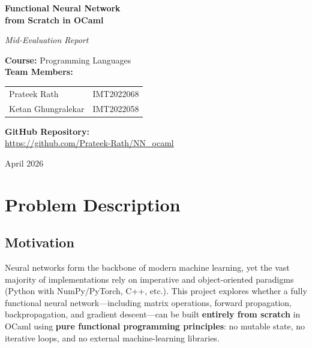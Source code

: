 \documentclass[12pt, a4paper]{article}
\begin{document}
\begin{titlepage}
    \centering
    \vspace*{2cm}
    
    {\Huge\bfseries Functional Neural Network\\[0.3cm] from Scratch in OCaml\par}
    
    \vspace{1.5cm}
    
    {\Large\textit{Mid-Evaluation Report}\par}
    
    \vspace{2cm}
    
    {\large
    \textbf{Course:} Programming Languages\\[0.5cm]
    \textbf{Team Members:}\\[0.3cm]
    \begin{tabular}{ll}
        Prateek Rath & IMT2022068 \\
        Ketan Ghungralekar & IMT2022058 \\
    \end{tabular}
    \par}
    
    \vspace{1.5cm}
    
    {\large
    \textbf{GitHub Repository:}\\[0.2cm]
    \url{https://github.com/Prateek-Rath/NN_ocaml}
    \par}
    
    \vspace{2cm}
    
    {\large April 2026\par}
    
    \vfill
\end{titlepage}

\section{Problem Description}

\subsection{Motivation}

Neural networks form the backbone of modern machine learning, yet the vast majority of implementations rely on imperative and object-oriented paradigms (Python with NumPy/PyTorch, C++, etc.). This project explores whether a fully functional neural network---including matrix operations, forward propagation, backpropagation, and gradient descent---can be built \textbf{entirely from scratch} in OCaml using \textbf{pure functional programming principles}: no mutable state, no iterative loops, and no external machine-learning libraries.
\end{document}
